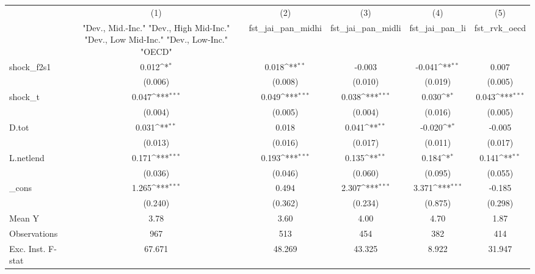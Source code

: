 {
\def\sym#1{\ifmmode^{#1}\else\(^{#1}\)\fi}
\begin{tabular}{l*{5}{c}}
\toprule
            &\multicolumn{1}{c}{(1)}&\multicolumn{1}{c}{(2)}&\multicolumn{1}{c}{(3)}&\multicolumn{1}{c}{(4)}&\multicolumn{1}{c}{(5)}\\
            &\multicolumn{1}{c}{ "Dev., Mid.-Inc." "Dev., High Mid-Inc." "Dev., Low Mid-Inc." "Dev., Low-Inc." "OECD" }&\multicolumn{1}{c}{fst\_jai\_pan\_midhi}&\multicolumn{1}{c}{fst\_jai\_pan\_midli}&\multicolumn{1}{c}{fst\_jai\_pan\_li}&\multicolumn{1}{c}{fst\_rvk\_oecd}\\
\midrule
shock\_f2s1  &       0.012\sym{*}  &       0.018\sym{**} &      -0.003         &      -0.041\sym{**} &       0.007         \\
            &     (0.006)         &     (0.008)         &     (0.010)         &     (0.019)         &     (0.005)         \\
\addlinespace
shock\_t     &       0.047\sym{***}&       0.049\sym{***}&       0.038\sym{***}&       0.030\sym{*}  &       0.043\sym{***}\\
            &     (0.004)         &     (0.005)         &     (0.004)         &     (0.016)         &     (0.005)         \\
\addlinespace
D.tot       &       0.031\sym{**} &       0.018         &       0.041\sym{**} &      -0.020\sym{*}  &      -0.005         \\
            &     (0.013)         &     (0.016)         &     (0.017)         &     (0.011)         &     (0.017)         \\
\addlinespace
L.netlend   &       0.171\sym{***}&       0.193\sym{***}&       0.135\sym{**} &       0.184\sym{*}  &       0.141\sym{**} \\
            &     (0.036)         &     (0.046)         &     (0.060)         &     (0.095)         &     (0.055)         \\
\addlinespace
\_cons      &       1.265\sym{***}&       0.494         &       2.307\sym{***}&       3.371\sym{***}&      -0.185         \\
            &     (0.240)         &     (0.362)         &     (0.234)         &     (0.875)         &     (0.298)         \\
\midrule
Mean Y      &        3.78         &        3.60         &        4.00         &        4.70         &        1.87         \\
Observations&         967         &         513         &         454         &         382         &         414         \\
Exc. Inst. F-stat&      67.671         &      48.269         &      43.325         &       8.922         &      31.947         \\
\bottomrule
\end{tabular}
}
